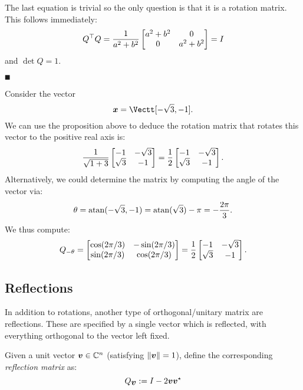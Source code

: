 The last equation is trivial so the only question is that it is a rotation matrix. This follows immediately:
\[
Q^\ensuremath{\top} Q = {1 \over a^2 + b^2}  \begin{bmatrix}
 a^2 + b^2 & 0 \cr 0 & a^2 + b^2
\end{bmatrix} = I
\]
and $\det Q = 1$.

\ensuremath{\QED}

\begin{example} Consider the vector
\[
\ensuremath{\bm{\x}} = \Vectt[-\sqrt{3},-1].
\]
We can use the proposition above to deduce the rotation matrix that rotates this vector to the positive real axis is:
\[
{1 \over \sqrt{1+3}} \begin{bmatrix} -1 & -\sqrt{3} \\ \sqrt{3} & -1 \end{bmatrix} = 
{1 \over 2} \begin{bmatrix} -1 & -\sqrt{3} \\ \sqrt{3} & -1 \end{bmatrix}.
\]
Alternatively, we could determine the matrix by computing the angle of the vector via:
\[
\ensuremath{\theta} =  {\rm atan}(-\sqrt{3}, -1) = {\rm atan}(\sqrt{3}) - \ensuremath{\pi} = -{2\ensuremath{\pi} \over 3}.
\]
We thus compute:
\[
Q_{-\ensuremath{\theta}} = \begin{bmatrix}
\cos(2\ensuremath{\pi}/3) & -\sin(2\ensuremath{\pi}/3) \\
\sin(2\ensuremath{\pi}/3) & \cos(2\ensuremath{\pi}/3)
\end{bmatrix} = {1 \over 2} \begin{bmatrix} -1 & -\sqrt{3} \\ \sqrt{3} & -1 \end{bmatrix}.
\]
\end{example}

\subsection{Reflections}
In addition to rotations, another type of orthogonal/unitary matrix are reflections. These are specified by a single vector which is reflected, with everything orthogonal to the vector left fixed. 

\begin{definition}  Given a unit vector $\bm{{\mbox{\boldmath$v$\unboldmath}}} \in {\mathbb C}^n$ (satisfying $\|\bm{{\mbox{\boldmath$v$\unboldmath}}}\|=1$), define the corresponding \emph{reflection matrix} as:
\[
Q_{\mbox{\boldmath$v$\unboldmath}} := I - 2 \bm{{\mbox{\boldmath$v$\unboldmath}}} \bm{{\mbox{\boldmath$v$\unboldmath}}}^\star
\]
\end{definition}

